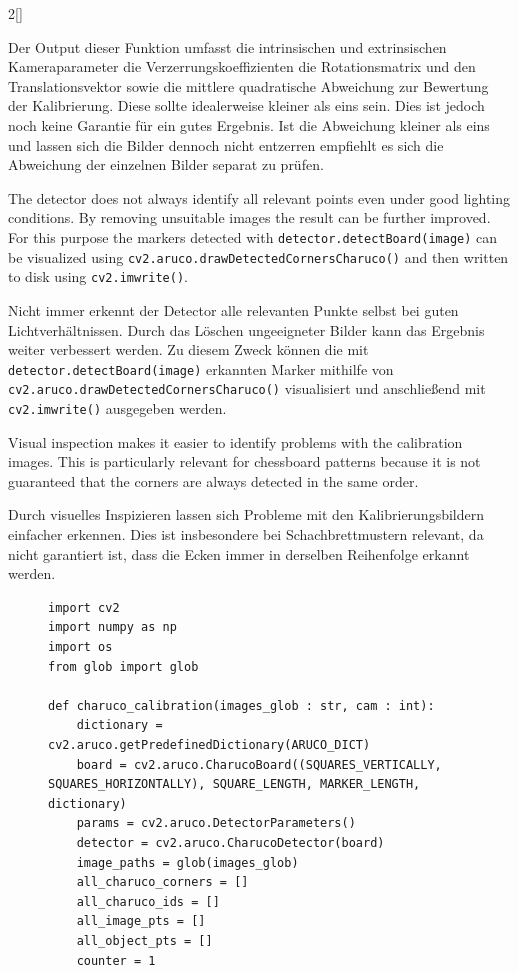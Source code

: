 \begin{paracol}{2}[]
\colger

Der Output dieser Funktion umfasst die intrinsischen und extrinsischen Kameraparameter die Verzerrungskoeffizienten die Rotationsmatrix und den Translationsvektor sowie die mittlere quadratische Abweichung zur Bewertung der Kalibrierung. Diese sollte idealerweise kleiner als eins sein. Dies ist jedoch noch keine Garantie für ein gutes Ergebnis. Ist die Abweichung kleiner als eins und lassen sich die Bilder dennoch nicht entzerren empfiehlt es sich die Abweichung der einzelnen Bilder separat zu prüfen.

\coleng

The detector does not always identify all relevant points even under good lighting conditions. By removing unsuitable images the result can be further improved. For this purpose the markers detected with \texttt{detector.detectBoard(image)} can be visualized using \texttt{cv2.aruco.drawDetectedCornersCharuco()} and then written to disk using \texttt{cv2.imwrite()}.

\colger

Nicht immer erkennt der Detector alle relevanten Punkte selbst bei guten Lichtverhältnissen. Durch das Löschen ungeeigneter Bilder kann das Ergebnis weiter verbessert werden. Zu diesem Zweck können die mit \texttt{detector.detectBoard(image)} erkannten Marker mithilfe von \texttt{cv2.aruco.drawDetectedCornersCharuco()} visualisiert und anschließend mit \texttt{cv2.imwrite()} ausgegeben werden.

\coleng

Visual inspection makes it easier to identify problems with the calibration images. This is particularly relevant for chessboard patterns because it is not guaranteed that the corners are always detected in the same order.

\colger

Durch visuelles Inspizieren lassen sich Probleme mit den Kalibrierungsbildern einfacher erkennen. Dies ist insbesondere bei Schachbrettmustern relevant, da nicht garantiert ist, dass die Ecken immer in derselben Reihenfolge erkannt werden.

\colende

\begin{figure}
	\begin{lstlisting}[style=shell]
import cv2
import numpy as np
import os
from glob import glob

def charuco_calibration(images_glob : str, cam : int):
	dictionary = cv2.aruco.getPredefinedDictionary(ARUCO_DICT)
	board = cv2.aruco.CharucoBoard((SQUARES_VERTICALLY, SQUARES_HORIZONTALLY), SQUARE_LENGTH, MARKER_LENGTH, dictionary)
	params = cv2.aruco.DetectorParameters()
	detector = cv2.aruco.CharucoDetector(board)
	image_paths = glob(images_glob)
	all_charuco_corners = []
	all_charuco_ids = []
	all_image_pts = []
	all_object_pts = []
	counter = 1


\end{lstlisting}
\end{figure}
\end{paracol}

